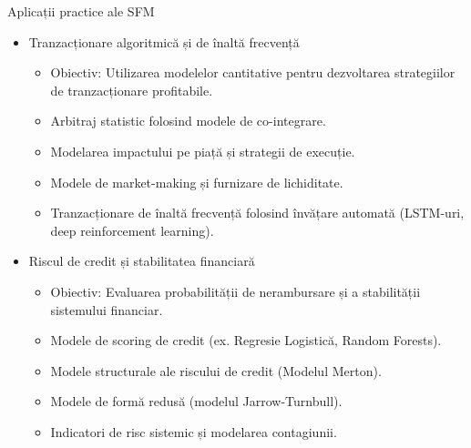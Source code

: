 \documentclass[9pt, aspectratio=169, t]{beamer}
\theoremstyle{definition}
\begin{document}
\begin{frame}{Aplicații practice ale SFM}
\begin{itemize}
    \item Tranzacționare algoritmică și de înaltă frecvență
    \begin{itemize}
        \item Obiectiv: Utilizarea modelelor cantitative pentru dezvoltarea strategiilor de tranzacționare profitabile.
        \item Arbitraj statistic folosind modele de co-integrare.
        \item Modelarea impactului pe piață și strategii de execuție.
        \item Modele de market-making și furnizare de lichiditate.
        \item Tranzacționare de înaltă frecvență folosind învățare automată (LSTM-uri, deep reinforcement learning).
    \end{itemize}
    \item Riscul de credit și stabilitatea financiară
    \begin{itemize}
        \item Obiectiv: Evaluarea probabilității de nerambursare și a stabilității sistemului financiar.
        \item Modele de scoring de credit (ex. Regresie Logistică, Random Forests).
        \item Modele structurale ale riscului de credit (Modelul Merton).
        \item Modele de formă redusă (modelul Jarrow-Turnbull).
        \item Indicatori de risc sistemic și modelarea contagiunii.
    \end{itemize}
\end{itemize}
\end{frame}
\end{document}
